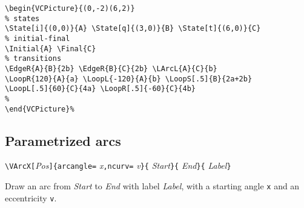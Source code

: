 \documentclass[11pt,twoside]{article}
\newlength{\ColoText}%
\newlength{\ColoFigu}%
\newlength{\parindenttemp} %
\newcommand{\noi}{\noindent}
\newlength{\jsIndent}%
\newlength{\ColSource}%
\newlength{\ColFigur}%
\begin{document}
\medskip 
\noi 
\hspace*{-\jsIndent}
\begin{minipage}[c]{\ColFigur}%
\par\vspace*{0mm}%
\begin{center}
\SmallPicture{}
\end{center}
\end{minipage}%
\hspace*{1.2em}%
\begin{minipage}[c]{\ColSource}
\setlength{\parindent}{\parindenttemp}%
\par\vspace*{0mm}%
\footnotesize
\begin{verbatim}
\begin{VCPicture}{(0,-2)(6,2)}
% states
\State[i]{(0,0)}{A} \State[q]{(3,0)}{B} \State[t]{(6,0)}{C}
% initial-final
\Initial{A} \Final{C}
% transitions 
\EdgeR{A}{B}{2b} \EdgeR{B}{C}{2b} \LArcL{A}{C}{b}
\LoopR{120}{A}{a} \LoopL{-120}{A}{b} \LoopS[.5]{B}{2a+2b} 
\LoopL[.5]{60}{C}{4a} \LoopR[.5]{-60}{C}{4b}
%
\end{VCPicture}%
\end{verbatim}
\normalsize
\end{minipage}%

\subsection{Parametrized arcs}

\noi 
\hspace*{-\jsIndent}
\begin{minipage}[c]{\ColoText+9em}
        \par\vspace*{0mm}%
        \footnotesize
\verb+\VArcX[+\textsl{Pos}\verb+]{arcangle=+%
   \textsl{x}\verb+,ncurv=+%
   \textsl{v}\verb+}{+%
   \textsl{Start}\verb+}{+%
   \textsl{End}\verb+}{+%
   \textsl{Label}\verb+}+
\end{minipage}%
  \begin{minipage}[c]{\ColoFigu-9em}%
\par\vspace*{0mm}%
Draw an arc from \textsl{Start} to \textsl{End} with label 
\textsl{Label}, with a starting angle \texttt{x} and an eccentricity 
\texttt{v}. 
\end{minipage}%
\end{document}
